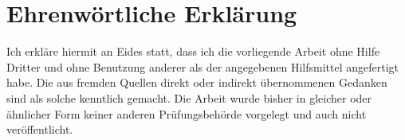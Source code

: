 \section*{Ehrenwörtliche Erklärung} %
    Ich erkläre hiermit an Eides statt, dass ich die vorliegende Arbeit ohne Hilfe Dritter und ohne Benutzung anderer als der angegebenen Hilfsmittel angefertigt habe. Die aus fremden Quellen direkt oder indirekt übernommenen Gedanken sind als solche kenntlich gemacht.
    Die Arbeit wurde bisher in gleicher oder ähnlicher Form keiner anderen Prüfungsbehörde vorgelegt und auch nicht veröffentlicht.
    \signature{Musterstadt}
 